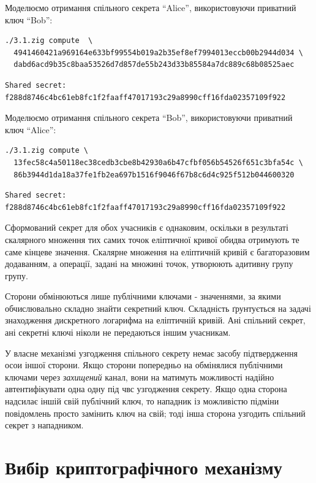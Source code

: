 \documentclass{kpi-lab}
\begin{document}
Моделюємо отримання спільного секрета \enquote{Alice},
використовуючи приватний ключ \enquote{Bob}:
\begin{verbatim}
./3.1.zig compute  \
  4941460421a969164e633bf99554b019a2b35ef8ef7994013eccb00b2944d034 \
  dabd6acd9b35c8baa53526d7d857de55b243d33b85584a7dc889c68b08525aec
\end{verbatim}
\begin{verbatim}
Shared secret: f288d8746c4bc61eb8fc1f2faaff47017193c29a8990cff16fda02357109f922
\end{verbatim}

Моделюємо отримання спільного секрета \enquote{Bob},
використовуючи приватний ключ \enquote{Alice}:
\begin{verbatim}
./3.1.zig compute \
  13fec58c4a50118ec38cedb3cbe8b42930a6b47cfbf056b54526f651c3bfa54c \
  86b3944d1da18a37fe1fb2ea697b1516f9046f67b8c6d4c925f512b044600320
\end{verbatim}
\begin{verbatim}
Shared secret: f288d8746c4bc61eb8fc1f2faaff47017193c29a8990cff16fda02357109f922
\end{verbatim}

Сформований секрет для обох учасників є однаковим,
оскільки в результаті скалярного множення тих самих точок
еліптичної кривої обидва отримують те саме кінцеве
значення. Скалярне множення на еліптичній кривій є
багаторазовим додаванням, а операції, задані на множині
точок, утворюють адитивну групу групу.

Сторони обмінюються лише публічними ключами - значеннями,
за якими обчислювально складно знайти секретний ключ.
Складність ґрунтується на задачі знаходження
дискретного логарифма на еліптичній кривій.
Ані спільний секрет, ані секретні ключі ніколи не
передаються іншим учасникам.

У власне механізмі узгодження спільного секрету немає
засобу підтвердження осои іншої сторони. Якщо сторони
попередньо на обмінялися публічними ключами через
\emph{захищений} канал, вони на матимуть можливості надійно
автентифікувати одна одну під чвс узгодження секрету.
Якщо одна сторона надсилає іншій свій публічний ключ, то
нападник із можливістю підміни повідомлень просто замінить
ключ на свій; тоді інша сторона узгодить спільний секрет з нападником.

\chapter{Вибір криптографічного механізму}
\end{document}
